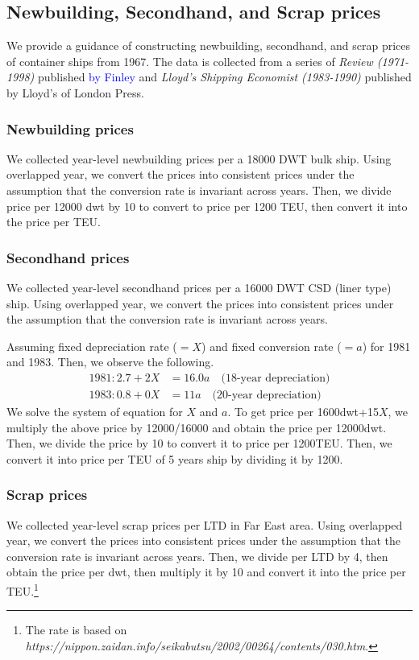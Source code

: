 \subsection{Newbuilding, Secondhand, and Scrap prices}
We provide a guidance of constructing newbuilding, secondhand, and scrap prices of container ships from 1967. The data is collected from a series of \textit{Review (1971-1998)} published \textcolor{blue}{by Finley} and \textit{Lloyd's Shipping Economist (1983-1990)} published by Lloyd's of London Press. 

\subsubsection{Newbuilding prices}
We collected year-level newbuilding prices per a 18000 DWT bulk ship. Using overlapped year, we convert the prices into consistent prices under the assumption that the conversion rate is invariant across years. Then, we divide price per 12000 dwt by 10 to convert to price per 1200 TEU, then convert it into the price per TEU.

\subsubsection{Secondhand prices}
We collected year-level secondhand prices per a 16000 DWT CSD (liner type) ship. Using overlapped year, we convert the prices into consistent prices under the assumption that the conversion rate is invariant across years.

Assuming fixed depreciation rate ($= X$) and fixed conversion rate ($= a$) for 1981 and 1983. Then, we observe the following.
\begin{align*}
    1981: 2.7 + 2X &= 16.0a \quad\text{(18-year depreciation)}\\
    1983: 0.8 + 0X &=11a \quad\text{(20-year depreciation)}
\end{align*}
We solve the system of equation for $X$ and $a$. To get price per 1600dwt+15$X$, we multiply the above price by 12000/16000 and obtain the price per 12000dwt. Then, we divide the price by 10 to convert it to price per 1200TEU. Then, we convert it into price per TEU of 5 years ship by dividing it by 1200.


\subsubsection{Scrap prices}

We collected year-level scrap prices per LTD in Far East area. Using overlapped year, we convert the prices into consistent prices under the assumption that the conversion rate is invariant across years. 
Then, we divide per LTD by 4, then obtain the price per dwt, then multiply it by 10 and convert it into the price per TEU.\footnote{The rate is based on \textit{https://nippon.zaidan.info/seikabutsu/2002/00264/contents/030.htm}.}


